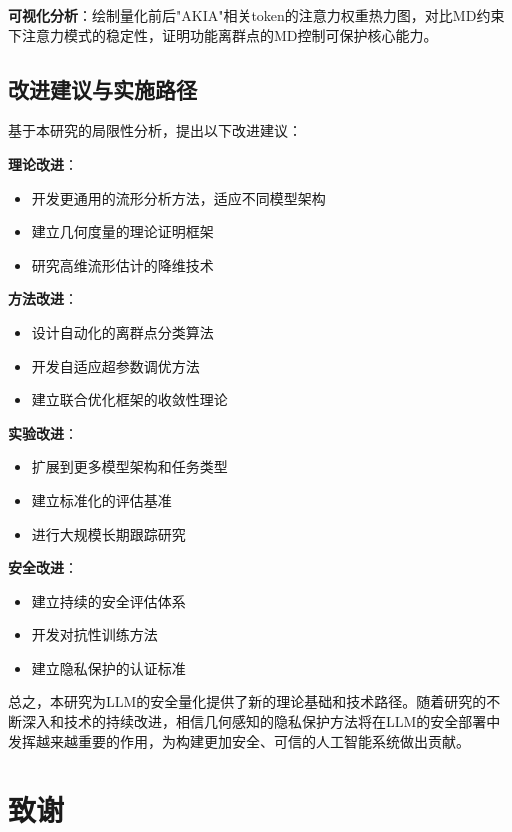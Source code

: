 \textbf{可视化分析}：绘制量化前后"AKIA"相关token的注意力权重热力图，对比MD约束下注意力模式的稳定性，证明功能离群点的MD控制可保护核心能力。

\subsection{改进建议与实施路径}

基于本研究的局限性分析，提出以下改进建议：

\textbf{理论改进}：
\begin{itemize}
\item 开发更通用的流形分析方法，适应不同模型架构
\item 建立几何度量的理论证明框架
\item 研究高维流形估计的降维技术
\end{itemize}

\textbf{方法改进}：
\begin{itemize}
\item 设计自动化的离群点分类算法
\item 开发自适应超参数调优方法
\item 建立联合优化框架的收敛性理论
\end{itemize}

\textbf{实验改进}：
\begin{itemize}
\item 扩展到更多模型架构和任务类型
\item 建立标准化的评估基准
\item 进行大规模长期跟踪研究
\end{itemize}

\textbf{安全改进}：
\begin{itemize}
\item 建立持续的安全评估体系
\item 开发对抗性训练方法
\item 建立隐私保护的认证标准
\end{itemize}

总之，本研究为LLM的安全量化提供了新的理论基础和技术路径。随着研究的不断深入和技术的持续改进，相信几何感知的隐私保护方法将在LLM的安全部署中发挥越来越重要的作用，为构建更加安全、可信的人工智能系统做出贡献。

\section*{致谢}

